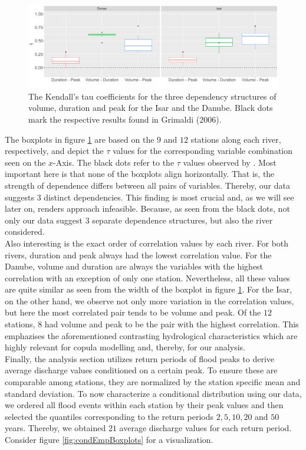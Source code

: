 \documentclass[
]{krantz}
\begin{document}
\begin{figure}

{\centering \includegraphics[width=0.7\linewidth]{work/04-floodfreq/figures/data_cor_plot} 

}

\caption{The Kendall's tau coefficients for the three dependency structures of volume, duration and peak for the Isar and the Danube. Black dots mark the respective results found in Grimaldi (2006).}\label{fig:corplot}
\end{figure}

The boxplots in figure \ref{fig:corplot}
are based on the \(9\) and \(12\) stations along each river, respectively, and
depict the \(\tau\) values for the corresponding variable combination seen on the \(x\)-Axis.
The black dots refer to the \(\tau\) values observed by \citet{grimaldi2006}.
Most important here is that none of the boxplots align horizontally. That is, the strength of dependence
differs between all pairs of variables.
Thereby, our data suggests \(3\) distinct dependencies.
This finding is most crucial and, as we will see later on, renders \citet{grimaldi2006} approach infeasible. Because, as seen from the black dots, not only our data suggest \(3\) separate dependence structures, but also the river \citet{grimaldi2006} considered.\\
Also interesting is the exact order of correlation values by each river.
For both rivers, duration and peak always had the lowest correlation value.
For the Danube,
volume and duration are always the variables with the highest correlation with an exception of only one station.
Nevertheless, all these values are quite similar as seen from the width of the boxplot in figure \ref{fig:corplot}.
For the Isar, on the other hand, we observe not only more variation in the correlation
values, but here the most correlated pair tends to be volume and peak. Of the \(12\) stations, \(8\)
had volume and peak to be the pair with the highest correlation.
This emphazises the aforementioned contrasting
hydrological characteristics which are highly relevant for copula modelling and, thereby, for our analysis.\\
Finally, the analysis section utilizes return periods of flood peaks to derive
average discharge values conditioned on a certain peak.
To ensure these are
comparable among stations, they are normalized by the station specific mean and standard deviation.
To now characterize a conditional distribution using our data, we ordered all flood events within each station
by their peak values and then selected the quantiles corresponding to the
return periods \(2, 5, 10, 20\) and \(50\) years.
Thereby, we obtained \(21\) average discharge values for each return period.
Consider figure \ref{fig:condEmpBoxplots} for a visualization.
\end{document}

